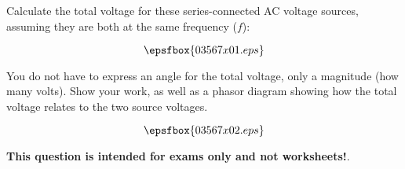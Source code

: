

Calculate the total voltage for these series-connected AC voltage sources, assuming they are both at the same frequency ($f$):

$$\epsfbox{03567x01.eps}$$

You do not have to express an angle for the total voltage, only a magnitude (how many volts).  Show your work, as well as a phasor diagram showing how the total voltage relates to the two source voltages.

\vskip 30pt







$$\epsfbox{03567x02.eps}$$







{\bf This question is intended for exams only and not worksheets!}.



